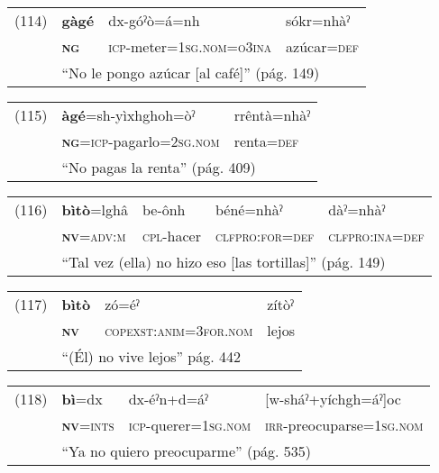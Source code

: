 {\setmainfont{Charis SIL} 

\begin{tabular}{llll}
(114) & \textbf{gàgé} & dx-góˀò=á=nh & sókr=nhàˀ \\
& \textsc{\textbf{ng}} & \textsc{icp-}meter=\textsc{1sg.nom=o3ina} & azúcar=\textsc{def} \\
& \multicolumn{3}{l}{``No le pongo azúcar [al café]'' (pág. 149)}
\end{tabular} \vspace{0.5cm}

\begin{tabular}{lll}
(115) & \textbf{àgé}=sh-yìxhghoh=òˀ & rrêntà=nhàˀ \\
& \textsc{\textbf{ng}=icp-}pagarlo\textsc{=2sg.nom} & renta=\textsc{def} \\
& \multicolumn{2}{l}{``No pagas la renta'' (pág. 409)}
\end{tabular} \vspace{0.5cm}

\begin{tabular}{lllll}
(116) & \textbf{bìtò}=lghâ & be-ônh & béné=nhàˀ & dàˀ=nhàˀ \\
& \textsc{\textbf{nv}=adv:m} & \textsc{cpl-}hacer & \textsc{clfpro:for=def} & \textsc{clfpro:ina=def} \\
& \multicolumn{4}{l}{``Tal vez (ella) no hizo eso [las tortillas]'' (pág. 149)}
\end{tabular} \vspace{0.5cm}

\begin{tabular}{llll}
(117) & \textbf{bìtò} & zó=éˀ & zítòˀ \\
& \textsc{\textbf{nv}} & \textsc{copexst:anim=3for.nom} & lejos \\
& \multicolumn{3}{l}{``(Él) no vive lejos'' pág. 442}
\end{tabular} \vspace{0.5cm}

\begin{tabular}{llll}
(118) & \textbf{bì}=dx & dx-éˀn+d=áˀ & [w-sháˀ+yíchgh=áˀ]oc \\
& \textsc{\textbf{nv}=ints} & \textsc{icp-}querer=\textsc{1sg.nom} & \textsc{irr-}preocuparse=\textsc{1sg.nom} \\
& \multicolumn{3}{l}{``Ya no quiero preocuparme'' (pág. 535)}
\end{tabular} \vspace{0.5cm}

}

